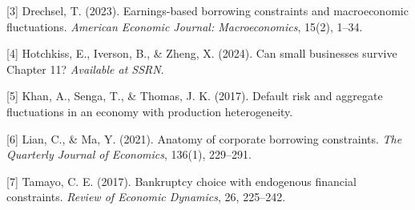 \documentclass[12pt]{article}
\begin{document}
\noindent
\hangindent=0.7cm
[3] Drechsel, T. (2023). Earnings-based borrowing constraints and macroeconomic fluctuations. \textit{American Economic Journal: Macroeconomics}, 15(2), 1--34.
\vspace{3mm}

\noindent
\hangindent=0.7cm
[4] Hotchkiss, E., Iverson, B., \& Zheng, X. (2024). Can small businesses survive Chapter 11? \textit{Available at SSRN}.
\vspace{3mm}

\noindent
\hangindent=0.7cm
[5] Khan, A., Senga, T., \& Thomas, J. K. (2017). Default risk and aggregate fluctuations in an economy with production heterogeneity.
\vspace{3mm}

\noindent
\hangindent=0.7cm
[6] Lian, C., \& Ma, Y. (2021). Anatomy of corporate borrowing constraints. \textit{The Quarterly Journal of Economics}, 136(1), 229--291.
\vspace{3mm}

\noindent
\hangindent=0.7cm
[7] Tamayo, C. E. (2017). Bankruptcy choice with endogenous financial constraints. \textit{Review of Economic Dynamics}, 26, 225--242.
\vspace{3mm}
\end{document}

